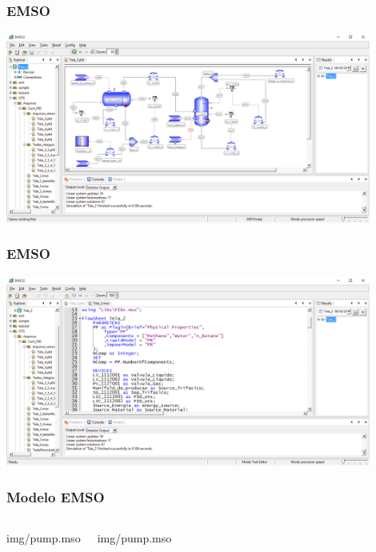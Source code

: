 \documentclass[aspectratio=169]{beamer}
\begin{document}
\begin{frame}
	\frametitle{EMSO}
	\begin{center}
		\includegraphics[width=0.9\textwidth]{img/EMSO_1.PNG}
	\end{center}
\end{frame}

\begin{frame}
	\frametitle{EMSO}
	\begin{center}
		\includegraphics[width=0.9\textwidth]{img/EMSO_2.PNG}
	\end{center}
\end{frame}
 
\begin{frame}
	\frametitle{Modelo EMSO}
	\footnotesize
		\begin{columns}[t] 
				 
				 {img/pump.mso}

				 
				 {img/pump.mso}
		\end{columns}
\end{frame}
 
\end{document}
